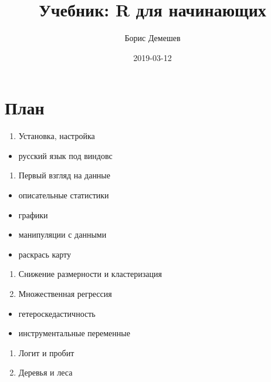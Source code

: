 \documentclass[russian,]{book}
\title{Учебник: R для начинающих}
\author{Борис Демешев}
\date{2019-03-12}
\providecommand{\tightlist}{%
  \setlength{\itemsep}{0pt}\setlength{\parskip}{0pt}}
\begin{document}
\maketitle

{
\setcounter{tocdepth}{1}
\tableofcontents
}
\hypertarget{intro}{%
\chapter{План}\label{intro}}

\begin{enumerate}
\def\labelenumi{\arabic{enumi}.}
\tightlist
\item
  Установка, настройка
\end{enumerate}

\begin{itemize}
\tightlist
\item
  русский язык под виндовс
\end{itemize}

\begin{enumerate}
\def\labelenumi{\arabic{enumi}.}
\tightlist
\item
  Первый взгляд на данные
\end{enumerate}

\begin{itemize}
\tightlist
\item
  описательные статистики
\item
  графики
\item
  манипуляции с данными
\item
  раскрась карту
\end{itemize}

\begin{enumerate}
\def\labelenumi{\arabic{enumi}.}
\item
  Снижение размерности и кластеризация
\item
  Множественная регрессия
\end{enumerate}

\begin{itemize}
\tightlist
\item
  гетероскедастичность
\item
  инструментальные переменные
\end{itemize}

\begin{enumerate}
\def\labelenumi{\arabic{enumi}.}
\item
  Логит и пробит
\item
  Деревья и леса
\end{enumerate}
\end{document}
